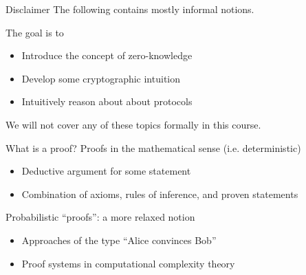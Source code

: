 \begin{frame}{Disclaimer}
  \pause
  The following contains mostly informal notions.

  \pause
  The goal is to
  \begin{itemize}[<+(1)->]
    \item Introduce the concept of zero-knowledge
    \item Develop some cryptographic intuition
    \item Intuitively reason about about protocols
  \end{itemize}

  \vfill

  \pause
  We will not cover any of these topics formally in this course.
\end{frame}

\begin{frame}{What is a proof?}
  \pause
  Proofs in the mathematical sense (i.e. deterministic)
  \begin{itemize}[<+(1)->]
    \item Deductive argument for some statement
    \item Combination of axioms, rules of inference, and proven statements
  \end{itemize}

  \vspace*{1em}

  \pause
  Probabilistic \enquote{proofs}: a more relaxed notion
  \begin{itemize}[<+(1)->]
    \item Approaches of the type \enquote{Alice convinces Bob}
    \item Proof systems in computational complexity theory
  \end{itemize}
\end{frame}

